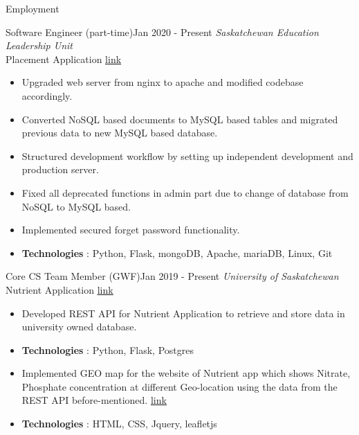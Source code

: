 \documentclass[]{mcdowellcv}
\begin{document}
	\begin{cvsection}{Employment}
	    \begin{cvsubsection}{Software Engineer (part-time)}{}{Jan 2020 - Present}
	    \emph{Saskatchewan Education Leadership Unit}\\
	    Placement Application \href{https://placement.usask.ca}{\underline{link}}
    	    \begin{itemize}
    	        \item Upgraded web server from nginx to apache and modified codebase accordingly.
    	        \item Converted NoSQL based documents to MySQL based tables and migrated previous data to new MySQL based database.
    	        \item Structured development workflow by setting up independent development and production server.
    	        \item Fixed all deprecated functions in admin part due to change of database from NoSQL to MySQL based.
    	        \item Implemented secured forget password functionality.
    	        \item \textbf{Technologies} : Python, Flask, mongoDB, Apache, mariaDB, Linux, Git
    	         
    	        
    	    \end{itemize}
    	
    	\end{cvsubsection}
    	
    		\begin{cvsubsection}{Core CS Team Member (GWF)}{}{Jan 2019 - Present}
    		\emph{University of Saskatchewan}\\
    		Nutrient Application \href{https://gwf.usask.ca/projects-facilities/nutrient-app.php#Overview}{ \underline{link}}
    	    \begin{itemize}
    	        \item Developed REST API for 
    	        Nutrient Application to retrieve and store data in university owned database. 
    	        \item \textbf{Technologies} : Python, Flask, Postgres
    	        \item Implemented GEO map for the website of Nutrient app which shows Nitrate, Phosphate concentration at different Geo-location using the data from the REST API before-mentioned. \href{https://gwf.usask.ca/projects-facilities/nutrient-app.php#ViewYourMeasurements}{\underline{link}}
    	        \item \textbf{Technologies} : HTML, CSS, Jquery, leafletjs
    	        

\end{itemize}
\end{cvsubsection}
\end{cvsection}
\end{document}
